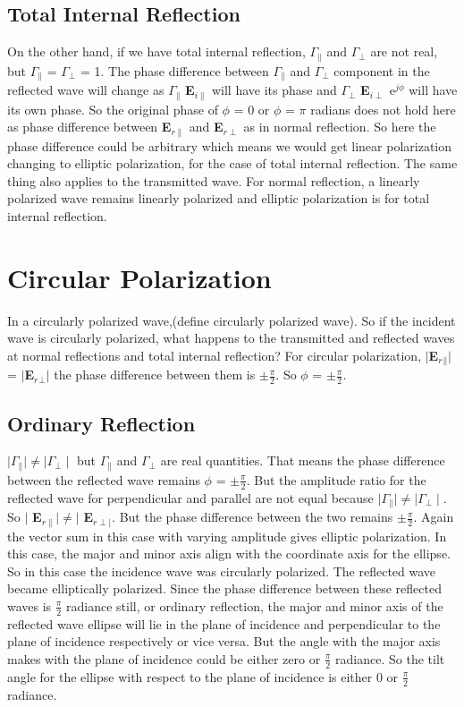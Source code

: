 \subsection{Total Internal Reflection}
On the other hand, if we have total internal reflection, $\Gamma_\parallel$ and $\Gamma_\perp$ are not real, but $\Gamma_\parallel$ = $\Gamma_\perp$ = 1. The phase difference between $\Gamma_\parallel$ and $\Gamma_\perp$ component in the reflected wave will change as $\Gamma_\parallel$ \textbf{E}$_{i\parallel}$ will have its phase and $\Gamma_\perp$ \textbf{E}$_{i\perp}$ e$^{j\phi}$ will have its own phase. So the original phase of $\phi$  = 0 or $\phi$ = $\pi$ radians does not hold here as phase difference between \textbf{E}$_{r\parallel}$  and \textbf{E}$_{r\perp}$ as in normal reflection. So here the phase difference could be arbitrary which means we would get linear polarization changing to elliptic polarization, for the case of total internal reflection. The same thing also applies to the transmitted wave. For normal reflection, a linearly polarized wave remains linearly polarized and elliptic polarization is for total internal reflection.

\section{Circular Polarization}
In a circularly polarized wave,(define circularly polarized wave). So if the incident wave is circularly polarized, what happens to the transmitted and reflected waves at normal reflections and total internal reflection? For circular polarization, $\mid$\textbf{E$_r$$_\parallel$}$\mid$ = $\mid$\textbf{E$_r$$_\perp$}$\mid$ the phase difference between them is $\pm\frac{\pi}{2}$. So $\phi$ = $\pm\frac{\pi}{2}$.

\subsection{Ordinary Reflection}
$\mid\Gamma_\parallel\mid \neq \mid\Gamma_\perp\mid$ but $\Gamma_\parallel$ and $\Gamma_\perp$ are real quantities. That means the phase difference between the reflected wave remains $\phi$ = $\pm\frac{\pi}{2}$. But the amplitude ratio for the reflected wave for perpendicular and parallel are not equal because $\mid\Gamma_\parallel\mid \neq \mid \Gamma_\perp \mid$. So $\mid$ \textbf{E}$_{r\parallel} \mid \neq \mid$ \textbf{E}$_{r\perp\mid}$. But the phase difference between the two remains $\pm\frac{\pi}{2}$. Again the vector sum in this case with varying amplitude gives elliptic polarization. In this case, the major and minor axis align with the coordinate axis for the ellipse. So in this case the incidence wave was circularly polarized. The reflected wave became elliptically polarized. Since the phase difference between these reflected waves is $\frac{\pi}{2}$ radiance still, or ordinary reflection, the major and minor axis of the reflected wave ellipse will lie in the plane of incidence and perpendicular to the plane of incidence respectively or vice versa. But the angle with the major axis makes with the plane of incidence could be either zero or $\frac{\pi}{2}$ radiance. So the tilt angle for the ellipse with respect to the plane of incidence is either 0 or $\frac{\pi}{2}$ radiance.

